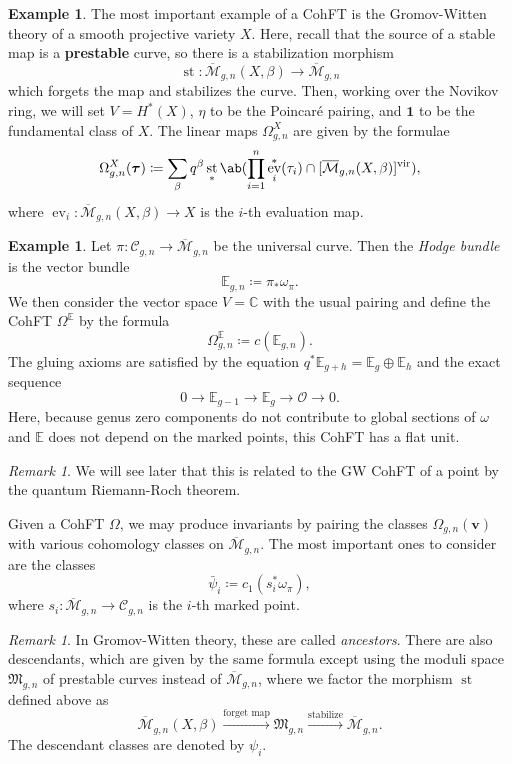 \documentclass{amsart}
\theoremstyle{definition}
\newtheorem{exm}[thm]{Example}
\theoremstyle{remark}
\newtheorem{rmk}[thm]{Remark}
\theoremstyle{plain}
\theoremstyle{definition}
\theoremstyle{remark}
\newcommand{\C}{\mathbb{C}}
\newcommand{\E}{\mathbb{E}}
\newcommand{\Mbar}{\overline{\mathcal{M}}}
\newcommand{\mc}[1]{\mathcal{#1}}
\newcommand{\mf}[1]{\mathfrak{#1}}
\newcommand{\mbf}[1]{\mathbf{#1}}
\newcommand{\bv}{\mbf{v}}
\newcommand{\btau}{\bm{\tau}}
\newcommand{\mr}[1]{\mathrm{#1}}
\newcommand{\1}{\mathbf{1}}
\newcommand{\2}{\mathbf{2}}
\newcommand{\3}{\mathbf{3}}
\newcommand{\vir}{\mr{vir}}
\DeclareMathOperator{\ev}{ev}
\DeclareMathOperator{\st}{st}
\begin{document}
\begin{exm}
    The most important example of a CohFT is the Gromov-Witten theory of a smooth projective variety $X$. Here, recall that the source of a stable map is a \textbf{prestable} curve, so there is a stabilization morphism
    \[ \st \colon \Mbar_{g,n}(X,\beta) \to \Mbar_{g,n} \]
    which forgets the map and stabilizes the curve. Then, working over the Novikov ring, we will set $V = H^*(X)$, $\eta$ to be the Poincar\'e pairing, and $\1$ to be the fundamental class of $X$. The linear maps $\Omega^X_{g,n}$ are given by the formulae
    \[ \Omega_{g,n}^X(\btau) \coloneqq \sum_{\beta} q^{\beta} \st_* \ab(\prod_{i=1}^n \ev_i^*(\tau_i) \cap [\Mbar_{g,n}(X,\beta)]^{\vir}), \]
    where $\ev_i \colon \Mbar_{g,n}(X,\beta) \to X$ is the $i$-th evaluation map.
\end{exm}

\begin{exm}
    Let $\pi \colon \mc{C}_{g,n} \to \Mbar_{g,n}$ be the universal curve. Then the \textit{Hodge bundle} is the vector bundle 
    \[ \E_{g,n} \coloneqq \pi_* \omega_{\pi}. \]
    We then consider the vector space $V = \C$ with the usual pairing and define the CohFT $\Omega^{\E}$ by the formula
    \[ \Omega^{\E}_{g,n} \coloneqq c(\E_{g,n}). \]
    The gluing axioms are satisfied by the equation $q^* \E_{g+h} = \E_g \oplus \E_h$ and the exact sequence
    \[ 0 \to \E_{g-1} \to \E_g \to \mc{O} \to 0. \]
    Here, because genus zero components do not contribute to global sections of $\omega$ and $\E$ does not depend on the marked points, this CohFT has a flat unit.
\end{exm}

\begin{rmk}
    We will see later that this is related to the GW CohFT of a point by the quantum Riemann-Roch theorem. 
\end{rmk}

Given a CohFT $\Omega$, we may produce invariants by pairing the classes $\Omega_{g,n}(\bv)$ with various cohomology classes on $\Mbar_{g,n}$. The most important ones to consider are the classes
\[ \bar{\psi}_i \coloneqq c_1( s_i^* \omega_{\pi} ), \]
where $s_i \colon \Mbar_{g,n} \to \mc{C}_{g,n}$ is the $i$-th marked point.

\begin{rmk}
    In Gromov-Witten theory, these are called \textit{ancestors}. There are also descendants, which are given by the same formula except using the moduli space $\mf{M}_{g,n}$ of prestable curves instead of $\Mbar_{g,n}$, where we factor the morphism $\st$ defined above as
    \[ \Mbar_{g,n}(X,\beta) \xrightarrow{\text{forget map}} \mf{M}_{g,n} \xrightarrow{\text{stabilize}} \Mbar_{g,n}. \]
    The descendant classes are denoted by $\psi_i$.
\end{rmk}
\end{document}
